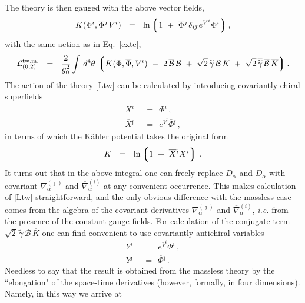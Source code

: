 \documentclass[12pt]{article}
\def\beq{\begin{equation}}
\def\eeq{\end{equation}}
\newcommand{\wt}{\widetilde}
\newcommand{\ov}{\overline}
\newcommand{\mc}[1]{\mathcal{#1}}
\newcommand{\lgr}{\left\lgroup}
\newcommand{\rgr}{\right\rgroup}
\newcommand{\tgamma}{\wt{\gamma}}
\newcommand{\bj}{{\bar \jmath}}
\begin{document}
	The theory is then gauged with the above vector fields,
\[
	K(\Phi^i, \ov{\Phi}{}^\bj\, V^i) ~~=~~
		\ln \lgr 1 ~+~ \ov{\Phi}{}^\bj\, \delta_{i\bj}\, e^{V^i} \Phi^i \rgr ,
\]	
	with the same action as in Eq.~\eqref{exte},
\beq
\label{Ltw}
	\mc{L}_{(0,2)}^\text{tw.m.} ~~=~~ \frac{2}{g_0^2} \int\, d^4\theta\, \lgr K(\Phi,\ov{\Phi}, V^i) 
		~-~ 2\, \ov{\mc{B}}\,\mc{B}  
		~+~  \sqrt{2}\, \tgamma\,\mc{B}\,K  ~+~ \sqrt{2}\, \ov{\tgamma}\,\ov{\mc{B}}\,\ov{K} \rgr.
\eeq
	The action of the theory \eqref{Ltw} can be calculated by introducing covariantly-chiral superfields
\begin{align*}
%
	X^i & ~~=~~ \Phi^i\,, \\
%
	\ov{X}{}^\bj & ~~=~~ e^{V^\bj} \ov{\Phi}{}^\bj\,,
\end{align*}
	in terms of which the K\"{a}hler potential takes the original form
\[
	K ~~=~~ \ln \lgr 1 ~+~ \ov{X}{}^i X^i \rgr\,.
\]
	It turns out that in the above integral one can freely replace $ D_\alpha $ and $ \ov{D}{}_\alpha $ with
	covariant $ \nabla^{(\bj)}_\alpha $ and $ \ov{\nabla}{}^{(i)}_\alpha $ at any convenient occurrence.
	This makes calculation of \eqref{Ltw} straightforward, and the only obvious difference with the massless
	case comes from the algebra of the covariant derivatives $ \nabla^{(\bj)}_\alpha $ and 
	$ \ov{\nabla}{}^{(i)}_\alpha $, {\it i.e.} from the presence of the constant gauge fields.
	For calculation of the conjugate term $ \sqrt{2}\, \ov{\tgamma}\,\ov{\mc{B}}\,\ov{K} $ one can find convenient to 
	use covariantly-antichiral variables
\begin{align*}
%
	Y^i & ~~=~~ e^{V^i} \Phi^i\,, \\
%
	Y^\bj & ~~=~~ \ov{\Phi}{}^\bj\,.
\end{align*}
	Needless to say that the result is obtained from the massless theory by the ``elongation" 
	of the space-time derivatives (however, formally, in four dimensions). Namely, in this way we arrive at
\end{document}
